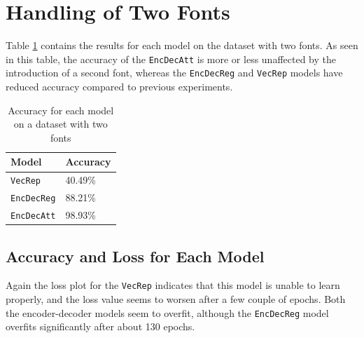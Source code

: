 
\section{Handling of Two Fonts}
\label{sec:handling_of_two_fonts}
Table \ref{table:accuracy_two_fonts} contains the results for each model on the dataset with two fonts. As seen in this table, the accuracy of the {\tt EncDecAtt} is more or less unaffected by the introduction of a second font, whereas the {\tt EncDecReg} and {\tt VecRep} models have reduced accuracy compared to previous experiments. 

\begin{table}[H]
    \centering
    \begin{tabular}{|l|l|}
        \hline 
        \textbf{Model}                  & \textbf{Accuracy}         \\ \hline
        {\tt VecRep }                   & 40.49\%                   \\ \hline
        {\tt EncDecReg}                 & 88.21\%                   \\ \hline
        {\tt EncDecAtt}                 & 98.93\%                   \\ \hline
    \end{tabular}
    \caption{Accuracy for each model on a dataset with two fonts}
    \label{table:accuracy_two_fonts}
\end{table}

\subsection{Accuracy and Loss for Each Model}
\newpage
{}

Again the loss plot for the {\tt VecRep} indicates that this model is unable to learn properly, and the loss value seems to worsen after a few couple of epochs. Both the encoder-decoder models seem to overfit, although the {\tt EncDecReg} model overfits significantly after about 130 epochs.

